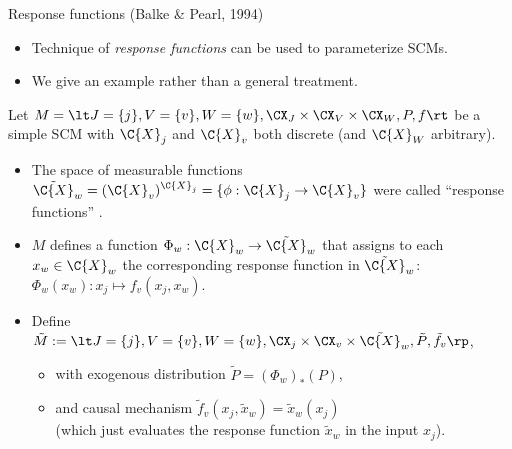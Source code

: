\begin{frame}{Response functions (Balke \& Pearl, 1994)}
  \begin{itemize}
    \item Technique of \emph{response functions} can be used to parameterize SCMs.
    \item We give an example rather than a general treatment.
  \end{itemize}

\begin{Def}[\ref{def:response_functions}]
  Let $M = \lt J=\{j\}, V=\{v\}, W=\{w\}, \CX_J \times \CX_V \times \CX_W, P, f \rt$ be a simple SCM
  with $\C{X}_j$ and $\C{X}_v$ both discrete (and $\C{X}_W$ arbitrary).
  \begin{itemize}
    \item The space of measurable functions
  $\tilde{\C{X}}_w = (\C{X}_v)^{\C{X}_j} = \{\phi : \C{X}_j \to \C{X}_v\}$
  were called ``response functions'' \cite{BalkePearl1994b}.
\item $M$ defines a function $\Phi_w : \C{X}_w \to \tilde{\C{X}}_w$ that assigns to each $x_w \in \C{X}_w$ the corresponding response function in $\tilde{\C{X}}_w$:
  $\Phi_w(x_w) : x_j \mapsto f_v(x_j, x_w)$.
  \item Define $\tilde{M} := \lt J=\{j\}, V=\{v\}, W=\{w\}, \CX_j \times \CX_v \times \tilde{\C{X}}_w, \tilde{P}, \tilde{f}_v \rp$,
    \begin{itemize}
      \item with exogenous distribution $\tilde{P} = (\Phi_w)_* (P)$,
      \item and causal mechanism $\tilde{f}_v(x_j,\tilde{x}_w) = \tilde{x}_w(x_j)$\\
        (which just evaluates the response function $\tilde{x}_w$ in the input $x_j$).
    \end{itemize}
  \end{itemize}
  \end{Def}
\end{frame}

